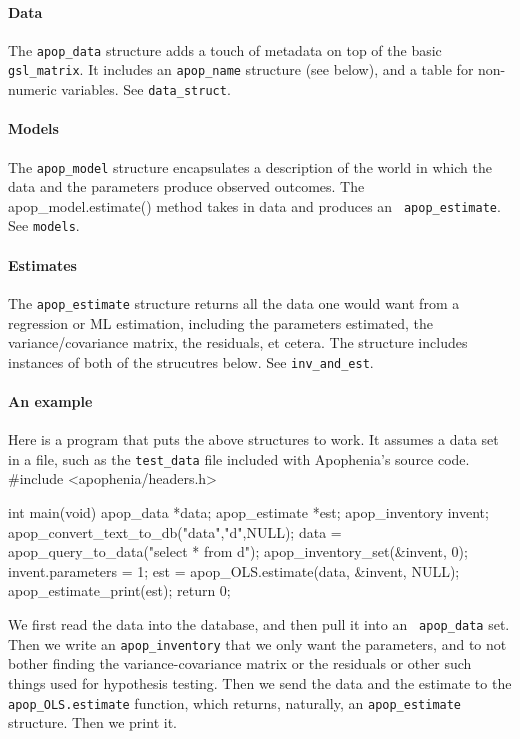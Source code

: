 \paragraph{Data}
The {\tt apop\_data} structure adds a touch of metadata on
top of the basic {\tt gsl\_matrix}. It includes an {\tt apop\_name} structure
(see below), and a table for non-numeric variables. See {\tt data\_struct}.

\paragraph{Models}
The {\tt apop\_model} structure encapsulates a description of the world
in which the data and the parameters produce observed outcomes. The
apop\_model.estimate() method takes in data and produces an {\tt
apop\_estimate}. See {\tt models}.

\paragraph{Estimates}
The {\tt apop\_estimate} structure returns all the data one would want
from a regression or ML estimation, including the parameters estimated,
the variance/covariance matrix, the residuals, et cetera. The structure
includes instances of both of the strucutres below. See {\tt inv\_and\_est}.


\paragraph{An example}
Here is a program that puts the above structures to work.  It assumes a
data set in a file, such as the {\tt test\_data} file included with
Apophenia's source code.
#include <apophenia/headers.h>

int main(void){
apop_data       *data;
apop_estimate   *est;
apop_inventory  invent;
    apop_convert_text_to_db("data","d",NULL);
    data       = apop_query_to_data("select * from d");
    apop_inventory_set(&invent, 0);
    invent.parameters   = 1;
    est  = apop_OLS.estimate(data, &invent, NULL);
    apop_estimate_print(est);
    return 0;
}

We first read the data into the database, and then pull it into an {\tt
apop\_\-data} set. Then we write an {\tt apop\_\-inventory} that we only want the
parameters, and to not bother finding the variance-covariance matrix or
the residuals or other such things used for hypothesis testing. Then we
send the data and the estimate to the {\tt apop\_\-OLS.est\-i\-mate}
function, which returns, naturally, an {\tt apop\_\-est\-i\-mate}
structure. Then we print it.

